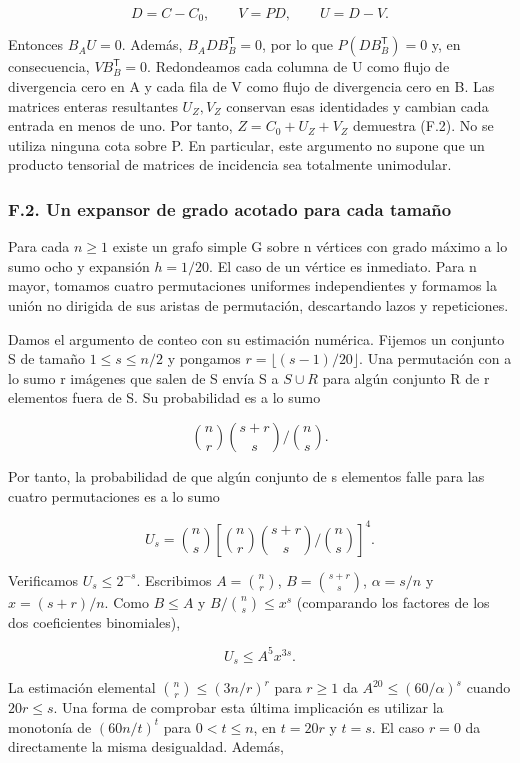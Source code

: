 \documentclass[spanish,11pt,a4paper]{article}
\begin{document}
\[D=C-C_0,\qquad V=PD,\qquad U=D-V.\]

Entonces \(B_AU=0\). Además, \(B_A D B_B^{\mathsf T}=0\), por lo que \(P(DB_B^{\mathsf T})=0\) y, en consecuencia, \(VB_B^{\mathsf T}=0\). Redondeamos cada columna de U como flujo de divergencia cero en A y cada fila de V como flujo de divergencia cero en B. Las matrices enteras resultantes \(U_{Z},V_{Z}\) conservan esas identidades y cambian cada entrada en menos de uno. Por tanto, \(Z=C_{0}+U_{Z}+V_{Z}\) demuestra (F.2). No se utiliza ninguna cota sobre P. En particular, este argumento no supone que un producto tensorial de matrices de incidencia sea totalmente unimodular.

\subsubsection{F.2. Un expansor de grado acotado para cada tamaño}\label{f.2.-un-expansor-de-grado-acotado-para-cada-tamauxf1o}

Para cada \(n\ge 1\) existe un grafo simple G sobre n vértices con grado máximo a lo sumo ocho y expansión \(h=1/20\). El caso de un vértice es inmediato. Para n mayor, tomamos cuatro permutaciones uniformes independientes y formamos la unión no dirigida de sus aristas de permutación, descartando lazos y repeticiones.

Damos el argumento de conteo con su estimación numérica. Fijemos un conjunto S de tamaño \(1\le s\le n/2\) y pongamos \(r=\lfloor (s-1)/20\rfloor\). Una permutación con a lo sumo r imágenes que salen de S envía S a \(S\cup R\) para algún conjunto R de r elementos fuera de S. Su probabilidad es a lo sumo

\[\binom nr\binom{s+r}s\big/\binom ns.\]

Por tanto, la probabilidad de que algún conjunto de s elementos falle para las cuatro permutaciones es a lo sumo

\[U_s=\binom ns\left[\binom nr\binom{s+r}s\big/\binom ns\right]^4.\]

Verificamos \(U_{s}\le 2^{-s}\). Escribimos \(A=\binom{n}{r}\), \(B=\binom{s+r}{s}\), \(\alpha=s/n\) y \(x=(s+r)/n\). Como \(B\le A\) y \(B/\binom{n}{s}\le x^{s}\) (comparando los factores de los dos coeficientes binomiales),

\[U_s\le A^5x^{3s}.\]

La estimación elemental \(\binom{n}{r}\le (3n/r)^{r}\) para \(r\ge 1\) da \(A^{20}\le (60/\alpha)^{s}\) cuando \(20r\le s\). Una forma de comprobar esta última implicación es utilizar la monotonía de \((60n/t)^{t}\) para \(0<t\le n\), en \(t=20r\) y \(t=s\). El caso \(r=0\) da directamente la misma desigualdad. Además,
\end{document}
